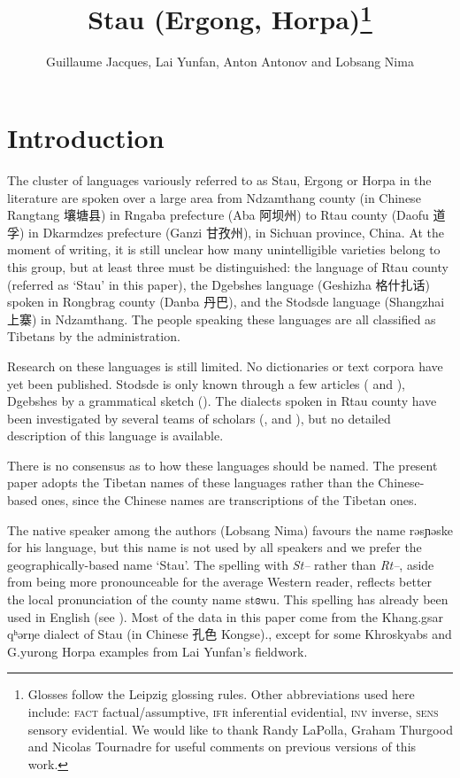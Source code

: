 \documentclass[oneside,a4paper,11pt]{article}
\newcommand{\ipa}[1]{{\phon #1}} %
\newcommand{\zh}[1]{{\cn #1}}
\begin{document}
 


\title{Stau (Ergong, Horpa)\footnote{Glosses follow the Leipzig glossing rules. Other abbreviations used here include:   \textsc{fact} factual/assumptive, \textsc{ifr} inferential evidential, \textsc{inv} inverse, \textsc{sens} sensory  evidential. We would like to thank Randy LaPolla, Graham Thurgood and Nicolas Tournadre for useful comments on previous versions of this work.}}
\author{Guillaume Jacques, Lai Yunfan, Anton Antonov and Lobsang Nima}

\maketitle
 

\section{Introduction}
The cluster of languages variously referred to as Stau, Ergong or Horpa in the literature are spoken over a large area from Ndzamthang county (in Chinese Rangtang  \zh{壤塘县})  in Rngaba  prefecture (Aba \zh{阿坝州}) to Rtau county (Daofu \zh{道孚}) in Dkarmdzes prefecture (Ganzi \zh{甘孜州}), in Sichuan province, China. At the moment of writing, it is still unclear how many unintelligible varieties belong to this group, but at least three must be distinguished: the language of Rtau county (referred as `Stau' in this paper), the Dgebshes language (Geshizha \zh{格什扎话})  spoken in Rongbrag county (Danba \zh{丹巴}), and the Stodsde language (Shangzhai \zh{上寨}) in Ndzamthang. The people speaking these languages are all classified as Tibetans by the administration.  

Research on these languages is still limited. No dictionaries or text corpora have yet been published. Stodsde is only known through a few articles (\citealt{jackson00sidaba} and   \citealt{jackson07shangzhai}), Dgebshes by a grammatical sketch (\citealt{duoerji98geshizha}). The dialects spoken in Rtau county have been investigated by several teams of scholars (\citealt{huangbf91daofu}, \citealt{sun13gexi} and \citealt{jacques14rtau}), but no detailed description of this language is available.

There is no consensus as to how these languages should be named. The present paper adopts the Tibetan names of these languages rather than the Chinese-based ones, since the Chinese names are transcriptions of the Tibetan ones. 

  The native speaker among the authors (Lobsang Nima) favours the name \ipa{rəsɲəske} for his language, but this name is not used by all speakers and we prefer the geographically-based name  `Stau'. The spelling with \textit{St--} rather than \textit{Rt--}, aside from being more pronounceable for the average Western reader, reflects better the local pronunciation of the county name \ipa{stɞwu}. This spelling has already been used in English (see \citealt{wang70stau}).   Most of the data in this paper come from the Khang.gsar \ipa{qʰərŋe} dialect of Stau (in Chinese \zh{孔色} Kongse)., except for some Khroskyabs and G.yurong Horpa examples from Lai Yunfan's fieldwork.
  
\end{document}
